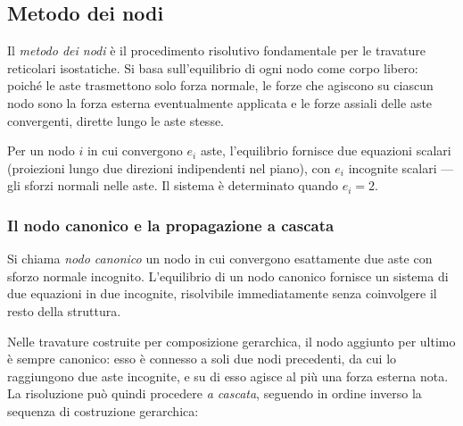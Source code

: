 \subsection{Metodo dei nodi}
\label{sec:metodo_nodi}

Il \emph{metodo dei nodi} è il procedimento risolutivo
fondamentale per le travature reticolari isostatiche.
Si basa sull'equilibrio di ogni nodo come corpo libero:
poiché le aste trasmettono solo forza normale, le forze
che agiscono su ciascun nodo sono la forza esterna
eventualmente applicata e le forze assiali delle aste
convergenti, dirette lungo le aste stesse.

Per un nodo $i$ in cui convergono $e_i$ aste, l'equilibrio
fornisce due equazioni scalari (proiezioni lungo due
direzioni indipendenti nel piano), con $e_i$ incognite
scalari --- gli sforzi normali nelle aste. Il sistema
è determinato quando $e_i = 2$.


\subsubsection{Il nodo canonico e la propagazione a cascata}

Si chiama \emph{nodo canonico} un nodo in cui
convergono esattamente due aste con sforzo normale
incognito. L'equilibrio di un nodo canonico fornisce
un sistema di due equazioni in due incognite,
risolvibile immediatamente senza coinvolgere
il resto della struttura.

Nelle travature costruite per composizione gerarchica,
il nodo aggiunto per ultimo è sempre canonico: esso
è connesso a soli due nodi precedenti, da cui lo
raggiungono due aste incognite, e su di esso agisce
al più una forza esterna nota. La risoluzione può
quindi procedere \emph{a cascata}, seguendo in ordine
inverso la sequenza di costruzione gerarchica:

